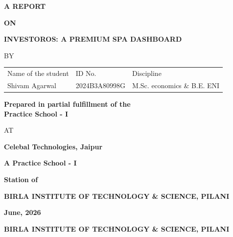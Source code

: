 \documentclass{book}
\begin{document}
\large

\thispagestyle{empty}
\centerline{\bf A REPORT}
\vspace*{0.3cm}
\centerline{\bf ON}
\vspace*{0.3cm}
\centerline{\bf  INVESTOROS: A PREMIUM SPA DASHBOARD}
\vspace*{2cm}

\centerline{BY}
\vspace*{1cm}

\begin{center}
	\begin{tabular}{lll}
		Name of the student & \hspace*{1cm} ID No. & \hspace*{1cm} Discipline \\
		Shivam Agarwal &\hspace*{1cm} 2024B3A80998G &\hspace*{1cm} M.Sc. economics \& B.E. ENI \\
	\end{tabular}
\end{center}

\vspace*{2cm}
\begin{center}
	{\bf Prepared in partial fulfillment of the \\
	Practice School - I} \\
\end{center}

\vspace*{0.5cm}

\centerline{AT}

\vspace*{1cm}
        \centerline{\bf Celebal Technologies, Jaipur}
	\vspace{0.2cm}
	\centerline{\bf A Practice School - I}
	\vspace{0.2cm}
	\centerline{\bf Station of}
	\vspace{0.5cm}
\begin{figure}[ht]
\epsfxsize=1.0in
\centerline{}
\end{figure}

	\centerline{\bf BIRLA INSTITUTE OF TECHNOLOGY \& SCIENCE, PILANI}
	\vspace*{0.5cm}
	\centerline{\bf June, 2026}
	\newpage

\thispagestyle{empty}

	\centerline{\bf BIRLA INSTITUTE OF TECHNOLOGY \& SCIENCE, PILANI}
	\vspace*{0.2cm}
\end{document}
